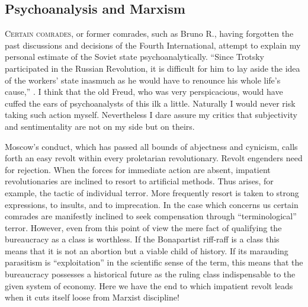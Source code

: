 
\subsection*{Psychoanalysis and Marxism}

\textsc{Certain comrades}, or former comrades, such as Bruno R., having forgotten the past discussions and decisions of the Fourth International, attempt to explain my personal estimate of the Soviet state psychoanalytically. “Since Trotsky participated in the Russian Revolution, it is difficult for him to lay aside the idea of the workers’ state inasmuch as he would have to renounce his whole life’s cause,” \etc. I think that the old Freud, who was very perspicacious, would have cuffed the ears of psychoanalysts of this ilk a little. Naturally I would never risk taking such action myself. Nevertheless I dare assure my critics that subjectivity and sentimentality are not on my side but on theirs.

Moscow’s conduct, which has passed all bounds of abjectness and cynicism, calls forth an easy revolt within every proletarian revolutionary. Revolt engenders need for rejection. When the forces for immediate action are absent, impatient revolutionaries are inclined to resort to artificial methods. Thus arises, for example, the tactic of individual terror. More frequently resort is taken to strong expressions, to insults, and to imprecation. In the case which concerns us certain comrades are manifestly inclined to seek compensation through “terminological” terror. However, even from this point of view the mere fact of qualifying the bureaucracy as a class is worthless. If the Bonapartist riff-raff is a class this means that it is not an abortion but a viable child of history. If its marauding parasitism is “exploitation” in the scientific sense of the term, this means that the bureaucracy possesses a historical future as the ruling class indispensable to the given system of economy. Here we have the end to which impatient revolt leads when it cuts itself loose from Marxist discipline!

